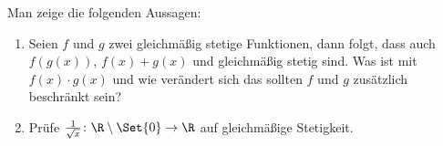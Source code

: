 \begin{exercise}
  Man zeige die folgenden Aussagen:
  \begin{enumerate}[label=(\alph*)]
  \item Seien $f$ und $g$ zwei gleichmäßig stetige Funktionen, dann folgt, dass
	  auch $f(g(x))$, $f(x) + g(x)$ und gleichmäßig stetig sind. Was ist mit $f(x) \cdot g(x)$ und wie verändert sich das sollten $f$ und $g$ zusätzlich beschränkt sein?
  \item Prüfe $\frac{1}{\sqrt{x}} \colon \R \setminus \Set{0} \to \R$ auf
    gleichmäßige Stetigkeit.
  \end{enumerate}
\end{exercise}
